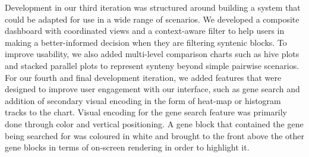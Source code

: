 Development in our third iteration was structured around building a system that could be adapted for use in a wide range of scenarios. We developed a composite dashboard with coordinated views and a context-aware filter to help users in making a better-informed decision when they are filtering syntenic blocks. To improve usability, we also added multi-level comparison charts such as hive plots and stacked parallel plots to represent synteny beyond simple pairwise scenarios. For our fourth and final development iteration, we added features that were designed to improve user engagement with our interface, such as gene search and addition of secondary visual encoding in the form of heat-map or histogram tracks to the chart. Visual encoding for the gene search feature was primarily done through color and vertical positioning. A gene block that contained the gene being searched for was coloured in white and brought to the front above the other gene blocks in terms of on-screen rendering in order to highlight it.